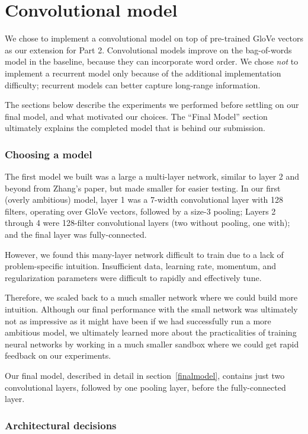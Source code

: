 \documentclass{article}
\begin{document}
\section{Convolutional model}

We chose to implement a convolutional model on top of pre-trained GloVe vectors as our extension for Part 2. Convolutional models improve on the bag-of-words model in the baseline, because they can incorporate word order. We chose \emph{not} to implement a recurrent model only because of the additional implementation difficulty; recurrent models can better capture long-range information.

The sections below describe the experiments we performed before settling on our final model, and what motivated our choices. The ``Final Model'' section ultimately explains the completed model that is behind our submission.

\subsubsection{Choosing a model}

The first model we built was a large a multi-layer network, similar to layer 2 and beyond from Zhang's paper, but made smaller for easier testing. In our first (overly ambitious) model, layer 1 was a 7-width convolutional layer with 128 filters, operating over GloVe vectors, followed by a size-3 pooling; Layers 2 through 4 were 128-filter convolutional layers (two without pooling, one with); and the final layer was fully-connected.

However, we found this many-layer network difficult to train due to a lack of problem-specific intuition. Insufficient data, learning rate, momentum, and regularization parameters were difficult to rapidly and effectively tune. 

Therefore, we scaled back to a much smaller network where we could build more intuition. Although our final performance with the small network was ultimately not as impressive as it might have been if we had successfully run a more ambitious model, we ultimately learned more about the practicalities of training neural networks by working in a much smaller sandbox where we could get rapid feedback on our experiments.

Our final model, described in detail in section~\ref{finalmodel}, contains just two convolutional layers, followed by one pooling layer, before the fully-connected layer.

\subsubsection{Architectural decisions}
\end{document}
